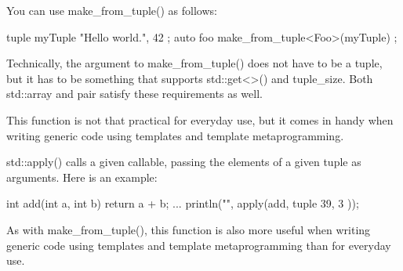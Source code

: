 You can use make\_from\_tuple() as follows:

\begin{cpp}
tuple myTuple { "Hello world.", 42 };
auto foo { make_from_tuple<Foo>(myTuple) };
\end{cpp}

Technically, the argument to make\_from\_tuple() does not have to be a tuple, but it has to be something that supports std::get<>() and tuple\_size. Both std::array and pair satisfy these requirements as well.

This function is not that practical for everyday use, but it comes in handy when writing generic code using templates and template metaprogramming.


std::apply() calls a given callable, passing the elements of a given tuple as arguments. Here is an example:

\begin{cpp}
int add(int a, int b) { return a + b; }
...
println("{}", apply(add, tuple { 39, 3 }));
\end{cpp}

As with make\_from\_tuple(), this function is also more useful when writing generic code using templates and template metaprogramming than for everyday use.








